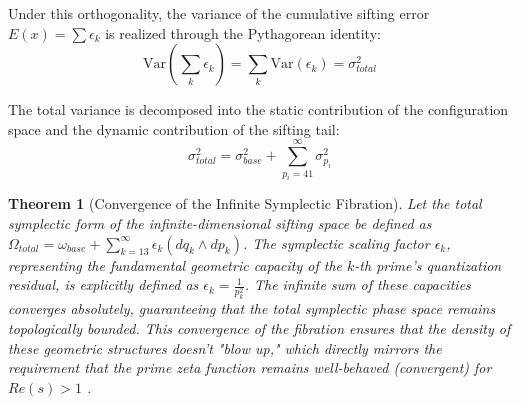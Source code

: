 \documentclass[sn-mathphys-num, pdflatex]{sn-jnl}
\newtheorem{theorem}{Theorem}[section]
\begin{document}
Under this orthogonality, the variance of the cumulative sifting error $E(x) = \sum \epsilon_k$ is realized through the Pythagorean identity:
\begin{equation}
\text{Var}\left( \sum_{k} \epsilon_k \right) = \sum_{k} \text{Var}(\epsilon_k) = \sigma_{total}^2
\end{equation}

The total variance is decomposed into the static contribution of the configuration space and the dynamic contribution of the sifting tail:
\begin{equation}
\sigma_{total}^2 = \sigma_{base}^2 + \sum_{p_i = 41}^{\infty} \sigma_{p_i}^2
\end{equation}

\begin{theorem}[Convergence of the Infinite Symplectic Fibration]
\label{the:infinite_fibration}
Let the total symplectic form of the infinite-dimensional sifting space be defined as $\Omega_{total} = \omega_{base} + \sum_{k=13}^{\infty} \epsilon_k (dq_k \wedge dp_k)$. The symplectic scaling factor $\epsilon_k$, representing the fundamental geometric capacity of the $k$-th prime's quantization residual, is explicitly defined as $\epsilon_k = \frac{1}{p_k^2}$. The infinite sum of these capacities converges absolutely, guaranteeing that the total symplectic phase space remains topologically bounded. This convergence of the fibration ensures that the density of these geometric structures doesn't "blow up," which directly mirrors the requirement that the prime zeta function remains well-behaved (convergent) for $Re(s) > 1$ \cite{froberg1968prime}.
\end{theorem}
\end{document}
